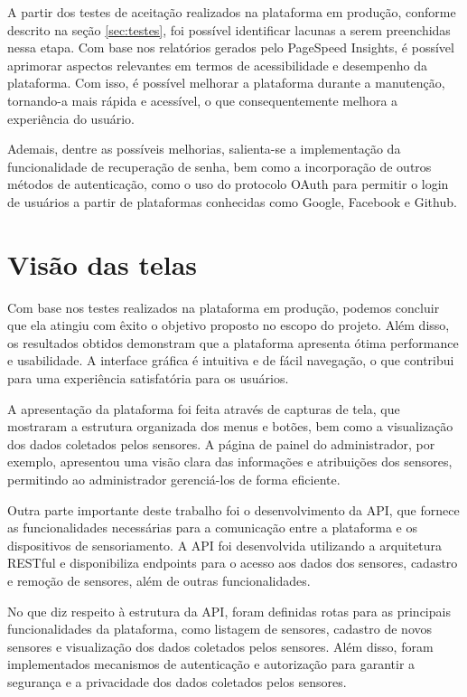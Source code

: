 \documentclass[tcc,capa]{texufpel}
\begin{document}
A partir dos testes de aceitação realizados na plataforma em produção, conforme descrito na seção \ref{sec:testes}, foi possível identificar lacunas a serem preenchidas nessa etapa. Com base nos relatórios gerados pelo PageSpeed Insights, é possível aprimorar aspectos relevantes em termos de acessibilidade e desempenho da plataforma. Com isso, é possível melhorar a plataforma durante a manutenção, tornando-a mais rápida e acessível, o que consequentemente melhora a experiência do usuário.

Ademais, dentre as possíveis melhorias, salienta-se a implementação da funcionalidade de recuperação de senha, bem como a incorporação de outros métodos de autenticação, como o uso do protocolo OAuth para permitir o login de usuários a partir de plataformas conhecidas como Google, Facebook e Github.
\chapter{Visão das telas}
Com base nos testes realizados na plataforma em produção, podemos concluir que ela atingiu com êxito o objetivo proposto no escopo do projeto. Além disso, os resultados obtidos demonstram que a plataforma apresenta ótima performance e usabilidade. A interface gráfica é intuitiva e de fácil navegação, o que contribui para uma experiência satisfatória para os usuários.

A apresentação da plataforma foi feita através de capturas de tela, que mostraram a estrutura organizada dos menus e botões, bem como a visualização dos dados coletados pelos sensores. A página de painel do administrador, por exemplo, apresentou uma visão clara das informações e atribuições dos sensores, permitindo ao administrador gerenciá-los de forma eficiente.

Outra parte importante deste trabalho foi o desenvolvimento da API, que fornece as funcionalidades necessárias para a comunicação entre a plataforma e os dispositivos de sensoriamento. A API foi desenvolvida utilizando a arquitetura RESTful e disponibiliza endpoints para o acesso aos dados dos sensores, cadastro e remoção de sensores, além de outras funcionalidades.

No que diz respeito à estrutura da API, foram definidas rotas para as principais funcionalidades da plataforma, como listagem de sensores, cadastro de novos sensores e visualização dos dados coletados pelos sensores. Além disso, foram implementados mecanismos de autenticação e autorização para garantir a segurança e a privacidade dos dados coletados pelos sensores.
\end{document}
